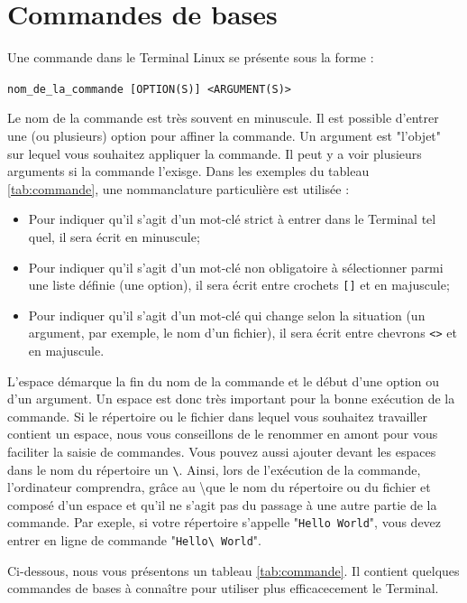 \documentclass[12pt]{book}
\begin{document}
\section{Commandes de bases}\label{sec:commandes}
	Une commande dans le Terminal Linux se présente sous la forme :
	\begin{center}
		\texttt{nom\_de\_la\_commande [OPTION(S)] <ARGUMENT(S)>}
	\end{center}\par
	Le nom de la commande est très souvent en minuscule.
	Il est possible d'entrer une (ou plusieurs) option pour affiner la commande.
	Un argument est "l'objet" sur lequel vous souhaitez appliquer la commande. 
	Il peut y a voir plusieurs arguments si la commande l'exisge.
	Dans les exemples du tableau \ref{tab:commande}, une nommanclature particulière est utilisée :
	\begin{itemize}
		\item Pour indiquer qu'il s'agit d'un mot-clé strict à entrer dans le Terminal tel quel, il sera écrit en minuscule;
		\item Pour indiquer qu'il s'agit d'un mot-clé non obligatoire à sélectionner parmi une liste définie (une option), il sera écrit entre crochets \texttt{[]} et en majuscule;
		\item Pour indiquer qu'il s'agit d'un mot-clé qui change selon la situation (un argument, par exemple, le nom d'un fichier), il sera écrit entre chevrons \texttt{<>} et en majuscule.
	\end{itemize}\par
	L'espace démarque la fin du nom de la commande et le début d'une option ou d'un argument.
	Un espace est donc très important pour la bonne exécution de la commande.
	Si le répertoire ou le fichier dans lequel vous souhaitez travailler contient un espace, nous vous conseillons de le renommer en amont pour vous faciliter la saisie de commandes.
	Vous pouvez aussi ajouter devant les espaces dans le nom du répertoire un \texttt{\textbackslash }.
	Ainsi, lors de l'exécution de la commande, l'ordinateur comprendra, grâce au \textbackslash que le nom du répertoire ou du fichier et composé d'un espace et qu'il ne s'agit pas du passage à une autre partie de la commande.
	Par exeple, si votre répertoire s'appelle "\texttt{Hello World}", vous devez entrer en ligne de commande "\texttt{Hello\textbackslash~World}".\par
	Ci-dessous, nous vous présentons un tableau \ref{tab:commande}.
	Il contient quelques commandes de bases à connaître pour utiliser plus efficacecement le Terminal.
\end{document}
